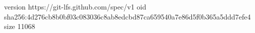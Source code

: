version https://git-lfs.github.com/spec/v1
oid sha256:4d276cb8b0bf03c083036c8ab8edcbd87ca659540a7e86d5f0b365a5ddd7efe4
size 11068

